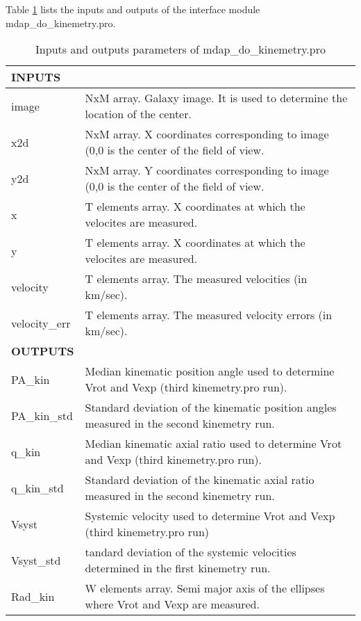 Table \ref{dap_tab:mdap_do_kinemetry} lists the inputs and outputs of
the interface module mdap\_do\_kinemetry.pro.

\begin{center}
\begin{longtable}{p{2.7cm}| p{11.1cm}}
\caption{Inputs and outputs parameters of
  mdap\_do\_kinemetry.pro} \label{dap_tab:mdap_do_kinemetry}
\\ \hline \endfirsthead

\hline
\endhead

\hline
\endlastfoot

\hline 
{\bf INPUTS} & \\ 
\hline 

image & NxM array. Galaxy image. It is used to determine the location
        of the center.\\
%
x2d & NxM array. X coordinates corresponding to image (0,0 is the
     center of the field of view.\\
% 
y2d & NxM array. Y coordinates corresponding to image (0,0 is the
     center of the field of view.\\
%
x & T elements array. X coordinates at which the velocites are measured. \\
%
y & T elements array. X coordinates at which the velocites are measured. \\
%
velocity & T elements array. The measured velocities (in km/sec).\\
%
velocity\_err & T elements array. The measured velocity errors (in km/sec).\\
%
\hline
{\bf OUTPUTS} & \\
\hline
PA\_kin &    Median kinematic position angle used to determine Vrot and Vexp (third kinemetry.pro run). \\ 
%
PA\_kin\_std & Standard deviation of the kinematic position angles measured in the second kinemetry run. \\
%
q\_kin &  Median kinematic axial ratio used to determine Vrot and Vexp (third kinemetry.pro run). \\ 
%
q\_kin\_std & Standard deviation of the kinematic axial ratio measured in the second kinemetry run. \ \\ 
%
Vsyst & Systemic velocity used to determine Vrot and Vexp (third kinemetry.pro run) \\ 
%
Vsyst\_std & tandard deviation of the systemic velocities determined in the first kinemetry run.\\ 
%
Rad\_kin & W elements array. Semi major axis of the ellipses where Vrot and Vexp are measured. \\ 

\end{longtable}
\end{center}
